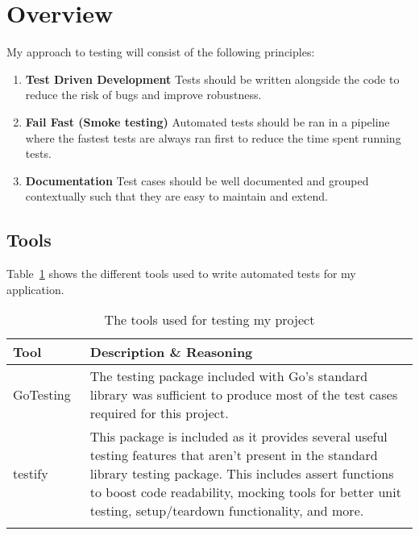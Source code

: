 \section{Overview}

My approach to testing will consist of the following principles:

\begin{enumerate}
  \item \textbf{Test Driven Development} Tests should be written alongside the code to reduce the risk of bugs and improve robustness.
  \item \textbf{Fail Fast (Smoke testing)} Automated tests should be ran in a pipeline where the fastest tests are always ran first to reduce the time spent running tests.
  \item \textbf{Documentation} Test cases should be well documented and grouped contextually such that they are easy to maintain and extend.
\end{enumerate}

\subsection*{Tools}

Table~\ref{tab:tools-testing} shows the different tools used to write automated tests for my application.

\begin{longtable}{p{} p{}}
  \toprule
  \textbf{Tool} & \textbf{Description \& Reasoning}
  \\\midrule\midrule
  Go\newline Testing~\cite{noauthor_testing_nodate-1}
  & The testing package included with Go's standard library was sufficient to produce most of the test cases required for this project.
  \\
  testify~\cite{noauthor_testify_2023}
  & This package is included as it provides several useful testing features that aren't present in the standard library testing package. This includes assert functions to boost code readability, mocking tools for better unit testing, setup/teardown functionality, and more.
  \\\bottomrule\bottomrule
  \caption{The tools used for testing my project}
  \label{tab:tools-testing}
\end{longtable}
